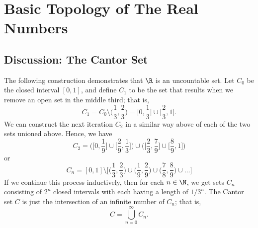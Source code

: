 \chapter{Basic Topology of The Real Numbers}

\section{Discussion: The Cantor Set}

The following construction demonstrates that \( \R  \) is an uncountable set. Let \( C_0  \) be the closed interval \( [0,1] \), and define \( C_1 \) to be the set that results when we remove an open set in the middle third; that is, 
\[ C_1 = C_0 \setminus \Big( \frac{ 1 }{ 3 } , \frac{ 2 }{ 3 }  \Big) = \Big[ 0, \frac{ 1 }{ 3 } \Big] \cup \Big[\frac{ 2 }{ 3 } , 1 \Big]. \]
We can construct the next iteration \( C_2 \) in a similar way above of each of the two sets unioned above. Hence, we have 
\[ C_2 = \Big(  \Big[ 0, \frac{ 1  }{ 9 } \Big] \cup \Big[ \frac{ 2 }{ 9 } , \frac{ 1 }{ 3 } \Big]   \Big) \cup \Big( \Big[ \frac{ 2 }{ 3 } , \frac{ 7 }{ 9 } \Big] \cup \Big[ \frac{ 8 }{ 9 } , 1\Big]\Big)\]
or
\[ C_n = [0,1] \setminus \Big[ \Big(  \frac{ 1 }{ 3 } , \frac{ 2 }{ 3 } \Big) \cup \Big( \frac{ 1 }{ 9 } , \frac{ 2 }{ 9 }  \Big) \cup \Big( \frac{ 7 }{ 8 } , \frac{ 8 }{ 9 }  \Big) \cup \dots   \Big]  \]
If we continue this process inductively, then for each \(  n \in \N  \), we get sets \( C_n \) consisting of \( 2^n \) closed intervals with each having a length of \( 1/3^n \). The Cantor set \( C \) is just the intersection of an infinite number of \( C_n \); that is, 
\[ C = \bigcup_{ n=0 }^{ \infty  } C_n. \]

